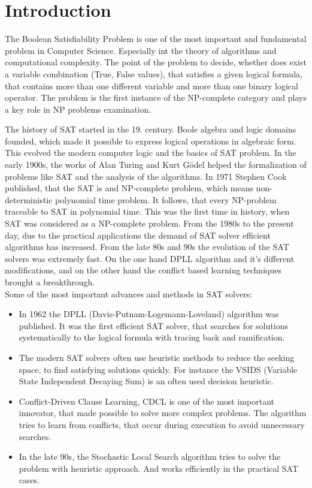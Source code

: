 \documentclass{article}
\begin{document}
\section{Introduction}
The Boolean Satisfiability Problem  is one of the most important and fundamental problem in Computer Science. Especially int the theory of algorithms and computational complexity. The point of the problem to decide, whether does exist a variable combination (True, False values), that satisfies a given logical formula, that contains more than one different variable and more than one binary logical operator. The problem is the first instance of the NP-complete category and plays a key role in NP problems examination.

The history of SAT started in the 19. century. Boole algebra and logic domains founded, which made it possible to express logical operations in algebraic form. This evolved the modern computer logic and the basics of SAT problem. In the early 1900s, the works of Alan Turing and Kurt Gödel helped the formalization of problems like SAT and the analysis of the algorithms. In 1971 Stephen Cook published, that the SAT is and NP-complete problem, which means non-deterministic polynomial time problem. It follows, that every NP-problem traceable to SAT in polynomial time. This was the first time in history, when SAT was considered as a NP-complete problem. From the 1980s to the present day, due to the practical applications the demand of SAT solver efficient algorithms has increased. From the late 80s and 90s the evolution of the SAT solvers was extremely fast. On the one hand DPLL algorithm and it's different modifications, and on the other hand the conflict based learning techniques brought a breakthrough.
\\Some of the most important advances and methods in SAT solvers:
\begin{itemize}
    \item In 1962 the DPLL (Davis-Putnam-Logemann-Loveland) algorithm was published. It was the first efficient SAT solver, that searches for solutions systematically to the logical formula with tracing back and ramification.
    \item The modern SAT solvers often use heuristic methods to reduce the seeking space, to find satisfying solutions quickly. For instance the VSIDS (Variable State Independent Decaying Sum) is an often used decision heuristic.
    \item Conflict-Driven Clause Learning, CDCL is one of the most important innovator, that made possible to solve more complex problems. The algorithm tries to learn from conflicts, that occur during execution to avoid unnecessary searches.
    \item In the late 90s, the Stochastic Local Search algorithm tries to solve the problem with heuristic approach. And works efficiently in the practical SAT cases.
\end{itemize}
\end{document}
